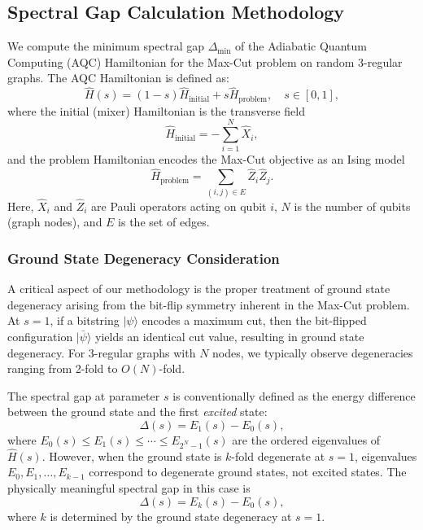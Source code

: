 
\subsection{Spectral Gap Calculation Methodology}

We compute the minimum spectral gap $\Delta_{\text{min}}$ of the Adiabatic Quantum Computing (AQC) Hamiltonian for the Max-Cut problem on random 3-regular graphs. The AQC Hamiltonian is defined as:
%
\begin{equation}
    \hat{H}(s) = (1-s)\hat{H}_{\text{initial}} + s\hat{H}_{\text{problem}}, \quad s \in [0,1],
\end{equation}
%
where the initial (mixer) Hamiltonian is the transverse field
%
\begin{equation}
    \hat{H}_{\text{initial}} = -\sum_{i=1}^{N} \hat{X}_i,
\end{equation}
%
and the problem Hamiltonian encodes the Max-Cut objective as an Ising model
%
\begin{equation}
    \hat{H}_{\text{problem}} = \sum_{(i,j) \in E} \hat{Z}_i \hat{Z}_j.
\end{equation}
%
Here, $\hat{X}_i$ and $\hat{Z}_i$ are Pauli operators acting on qubit $i$, $N$ is the number of qubits (graph nodes), and $E$ is the set of edges.

\subsubsection{Ground State Degeneracy Consideration}

A critical aspect of our methodology is the proper treatment of ground state degeneracy arising from the bit-flip symmetry inherent in the Max-Cut problem. At $s=1$, if a bitstring $|\psi\rangle$ encodes a maximum cut, then the bit-flipped configuration $|\bar{\psi}\rangle$ yields an identical cut value, resulting in ground state degeneracy. For 3-regular graphs with $N$ nodes, we typically observe degeneracies ranging from 2-fold to $O(N)$-fold.

The spectral gap at parameter $s$ is conventionally defined as the energy difference between the ground state and the first \emph{excited} state:
%
\begin{equation}
    \Delta(s) = E_1(s) - E_0(s),
\end{equation}
%
where $E_0(s) \leq E_1(s) \leq \cdots \leq E_{2^N-1}(s)$ are the ordered eigenvalues of $\hat{H}(s)$. However, when the ground state is $k$-fold degenerate at $s=1$, eigenvalues $E_0, E_1, \ldots, E_{k-1}$ correspond to degenerate ground states, not excited states. The physically meaningful spectral gap in this case is
%
\begin{equation}
    \Delta(s) = E_k(s) - E_0(s),
\end{equation}
%
where $k$ is determined by the ground state degeneracy at $s=1$.

